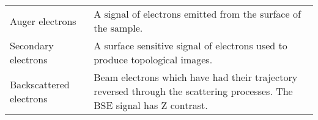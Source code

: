 \begin{table}[phb]
\begin{center}
\begin{tabular}{p{4cm}p{10.6cm}}
            Auger electrons         & A signal of electrons emitted from the surface of the sample.                                                                                                                                              \\
            Secondary electrons     & A surface sensitive signal of electrons used to produce topological images.                                                                                                                                \\
            Backscattered electrons & Beam electrons which have had their trajectory reversed through the scattering processes. The BSE signal has Z contrast.                                                                                   \\
            \hline
        \end{tabular}
    \end{center}
\end{table}